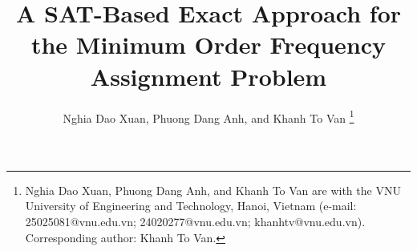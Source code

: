 \documentclass[letterpaper,journal]{IEEEtran}
\begin{document}
\title{A SAT-Based Exact Approach for the Minimum Order Frequency Assignment Problem}


\author{Nghia Dao Xuan, Phuong Dang Anh, and Khanh To Van
\thanks{Nghia Dao Xuan, Phuong Dang Anh, and Khanh To Van are with the VNU University of Engineering and Technology, Hanoi, Vietnam (e-mail: 25025081@vnu.edu.vn; 24020277@vnu.edu.vn; khanhtv@vnu.edu.vn). Corresponding author: Khanh To Van.}%
}



\maketitle
\end{document}
